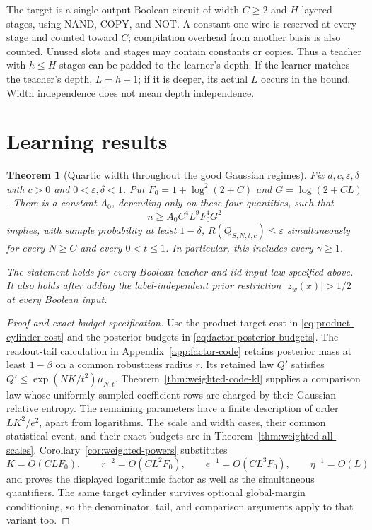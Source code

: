 \documentclass[11pt]{article}
\newtheorem{theorem}{Theorem}
\begin{document}
The target is a single-output Boolean circuit of width $C\ge2$ and $H$
layered stages, using NAND, COPY, and NOT. A constant-one wire is reserved
at every stage and counted toward $C$; compilation overhead from another
basis is also counted. Unused slots and stages may contain constants or
copies. Thus a teacher with $h\le H$ stages can be padded to the learner's
depth. If the learner matches the teacher's depth, $L=h+1$; if it is deeper,
its actual $L$ occurs in the bound. Width independence does not mean depth
independence.

\section{Learning results}

\begin{theorem}[Quartic width throughout the good Gaussian regimes]
\label{thm:headline-all-scales}
Fix $d,c,\varepsilon,\delta$ with $c>0$ and $0<\varepsilon,\delta<1$.
Put $F_0=1+\log^2(2+C)$ and $G=\log(2+CL)$.
There is a constant $A_0$, depending only on these four quantities,
such that
\[
 n\ge A_0 C^4L^9F_0^4G^2
\]
implies, with sample probability at least $1-\delta$,
$R(Q_{S,N,t,c})\le\varepsilon$ simultaneously for every $N\ge C$
and every $0<t\le1$. In particular, this includes every
$\gamma\ge1$.

The statement holds for every Boolean teacher and iid input law
specified above. It also holds after adding the label-independent
prior restriction $|z_w(x)|>1/2$ at every Boolean input.
\end{theorem}

\begin{proof}[Proof and exact-budget specification]
Use the product target cost in \eqref{eq:product-cylinder-cost} and
the posterior budgets in \eqref{eq:factor-posterior-budgets}.
The readout-tail calculation in Appendix~\ref{app:factor-code} retains
posterior mass at least $1-\beta$ on a common robustness radius $r$.
Its retained law $Q'$ satisfies $Q'\le \exp(NK/t^2)\mu_{N,t}$.
Theorem~\ref{thm:weighted-code-kl} supplies a comparison law whose
uniformly sampled coefficient rows are charged by their Gaussian
relative entropy. The remaining parameters have a finite description
of order $LK^2/e^2$, apart from logarithms.
The scale and width cases, their common statistical event, and their
exact budgets are in Theorem~\ref{thm:weighted-all-scales}.
Corollary~\ref{cor:weighted-powers} substitutes
\[
 K=O(CLF_0),\qquad r^{-2}=O(CL^2F_0),\qquad
 e^{-1}=O(CL^3F_0),\qquad \eta^{-1}=O(L)
\]
and proves the displayed logarithmic factor as well as the
simultaneous quantifiers. The same target cylinder survives optional
global-margin conditioning, so the denominator, tail, and comparison
arguments apply to that variant too.
\end{proof}
\end{document}
